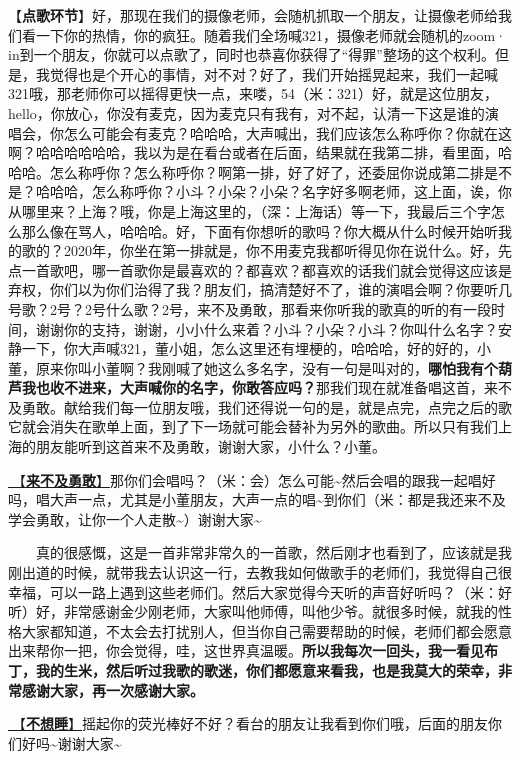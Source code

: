 \documentclass[]{ctexbook}
\begin{document}
【\textbf{点歌环节}】好，那现在我们的摄像老师，会随机抓取一个朋友，让摄像老师给我们看一下你的热情，你的疯狂。随着我们全场喊321，摄像老师就会随机的zoom· in到一个朋友，你就可以点歌了，同时也恭喜你获得了``得罪''整场的这个权利。但是，我觉得也是个开心的事情，对不对？好了，我们开始摇晃起来，我们一起喊321哦，那老师你可以摇得更快一点，来喽，54（米：321）好，就是这位朋友，hello，你放心，你没有麦克，因为麦克只有我有，对不起，认清一下这是谁的演唱会，你怎么可能会有麦克？哈哈哈，大声喊出，我们应该怎么称呼你？你就在这啊？哈哈哈哈哈哈，我以为是在看台或者在后面，结果就在我第二排，看里面，哈哈哈。怎么称呼你？怎么称呼你？啊第一排，好了好了，还委屈你说成第二排是不是？哈哈哈，怎么称呼你？小斗？小朵？小朵？名字好多啊老师，这上面，诶，你从哪里来？上海？哦，你是上海这里的，（深：上海话）等一下，我最后三个字怎么那么像在骂人，哈哈哈。好，下面有你想听的歌吗？你大概从什么时候开始听我的歌的？2020年，你坐在第一排就是，你不用麦克我都听得见你在说什么。好，先点一首歌吧，哪一首歌你是最喜欢的？都喜欢？都喜欢的话我们就会觉得这应该是弃权，你们以为你们治得了我？朋友们，搞清楚好不了，谁的演唱会啊？你要听几号歌？2号？2号什么歌？2号，来不及勇敢，那看来你听我的歌真的听的有一段时间，谢谢你的支持，谢谢，小小什么来着？小斗？小朵？小斗？你叫什么名字？安静一下，你大声喊321，董小姐，怎么这里还有埋梗的，哈哈哈，好的好的，小董，原来你叫小董啊？我刚喊了她这么多名字，没有一句是叫对的，\textbf{哪怕我有个葫芦我也收不进来，大声喊你的名字，你敢答应吗？}那我们现在就准备唱这首，来不及勇敢。献给我们每一位朋友哦，我们还得说一句的是，就是点完，点完之后的歌它就会消失在歌单上面，到了下一场就可能会替补为另外的歌曲。所以只有我们上海的朋友能听到这首来不及勇敢，谢谢大家，小什么？小董。

\hyperref[late-to-be-brave]{🎵【\textbf{来不及勇敢}】}那你们会唱吗？（米：会）怎么可能\textasciitilde 然后会唱的跟我一起唱好吗，唱大声一点，尤其是小董朋友，大声一点的唱\textasciitilde 到你们（米：都是我还来不及学会勇敢，让你一个人走散\textasciitilde）谢谢大家\textasciitilde{}

  真的很感慨，这是一首非常非常久的一首歌，然后刚才也看到了，应该就是我刚出道的时候，就带我去认识这一行，去教我如何做歌手的老师们，我觉得自己很幸福，可以一路上遇到这些老师们。然后大家觉得今天听的声音好听吗？（米：好听）好，非常感谢金少刚老师，大家叫他师傅，叫他少爷。就很多时候，就我的性格大家都知道，不太会去打扰别人，但当你自己需要帮助的时候，老师们都会愿意出来帮你一把，你会觉得，哇，这世界真温暖。\textbf{所以我每次一回头，我一看见布丁，我的生米，然后听过我歌的歌迷，你们都愿意来看我，也是我莫大的荣幸，非常感谢大家，再一次感谢大家。}

\hyperref[keep-playing]{🎵【\textbf{不想睡}】}摇起你的荧光棒好不好？看台的朋友让我看到你们哦，后面的朋友你们好吗\textasciitilde 谢谢大家\textasciitilde{}
\end{document}
